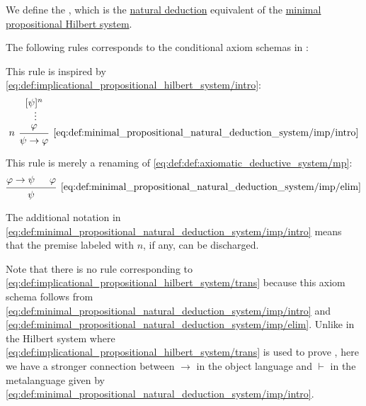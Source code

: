 \begin{definition}\label{def:minimal_propositional_natural_deduction_system}
  We define the , which is the \hyperref[def:natural_deduction_system]{natural deduction} equivalent of the \hyperref[def:minimal_propositional_hilbert_system]{minimal propositional Hilbert system}.

  \begin{thmenum}
     The following rules corresponds to the conditional axiom schemas in :

    \begin{minipage}[t]{0.45\textwidth}
      This rule is inspired by \eqref{eq:def:implicational_propositional_hilbert_system/intro}:
      \begin{equation*}\taglabel[\( \rightarrow^+ \)]{eq:def:minimal_propositional_natural_deduction_system/imp/intro}
        \begin{prooftree}
          \hypo{ [\psi]^n }
          \ellipsis {} { \varphi }
          \infer[left label=\( n \)]1[\ref{eq:def:minimal_propositional_natural_deduction_system/imp/intro}]{ \psi \rightarrow \varphi }
        \end{prooftree}
      \end{equation*}
    \end{minipage}
    \hfill
    \begin{minipage}[t]{0.45\textwidth}
      This rule is merely a renaming of \eqref{eq:def:def:axiomatic_deductive_system/mp}:
      \begin{equation*}\taglabel[\( \rightarrow^- \)]{eq:def:minimal_propositional_natural_deduction_system/imp/elim}
        \begin{prooftree}
          \hypo{ \varphi \rightarrow \psi }
          \hypo{ \varphi }
          \infer2[\ref{eq:def:minimal_propositional_natural_deduction_system/imp/elim}]{ \psi }
        \end{prooftree}
      \end{equation*}
    \end{minipage}

    The additional notation in \eqref{eq:def:minimal_propositional_natural_deduction_system/imp/intro} means that the premise labeled with \( n \), if any, can be discharged.

    Note that there is no rule corresponding to \eqref{eq:def:implicational_propositional_hilbert_system/trans} because this axiom schema follows from \eqref{eq:def:minimal_propositional_natural_deduction_system/imp/intro} and \eqref{eq:def:minimal_propositional_natural_deduction_system/imp/elim}. Unlike in the Hilbert system where \eqref{eq:def:implicational_propositional_hilbert_system/trans} is used to prove , here we have a stronger connection between \( \rightarrow \) in the object language and \( \vdash \) in the metalanguage given by \eqref{eq:def:minimal_propositional_natural_deduction_system/imp/intro}.


\end{thmenum}
\end{definition}

